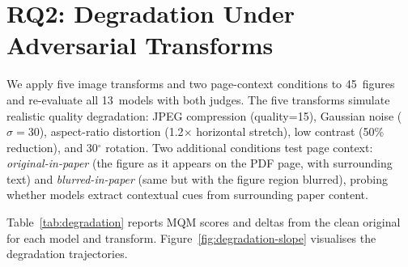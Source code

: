 \section{RQ2: Degradation Under Adversarial Transforms}\label{sec:rq2-results}

We apply five image transforms and two page-context conditions to 45~figures and re-evaluate all 13~models with both judges.
The five transforms simulate realistic quality degradation: JPEG compression (quality=15), Gaussian noise ($\sigma{=}30$), aspect-ratio distortion (1.2$\times$ horizontal stretch), low contrast (50\% reduction), and 30$^\circ$ rotation.
Two additional conditions test page context: \emph{original-in-paper} (the figure as it appears on the PDF page, with surrounding text) and \emph{blurred-in-paper} (same but with the figure region blurred), probing whether models extract contextual cues from surrounding paper content.

Table~\ref{tab:degradation} reports MQM scores and deltas from the clean original for each model and transform.
Figure~\ref{fig:degradation-slope} visualises the degradation trajectories.

